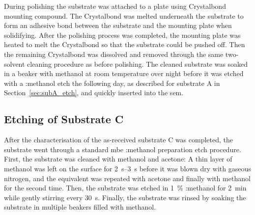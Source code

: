 During polishing the substrate was attached to a plate using Crystalbond mounting compound. The Crystalbond was melted underneath the substrate to form an adhesive bond between the substrate and the mounting plate when solidifying. After the polishing process was completed, the mounting plate was heated to melt the Crystalbond so that the substrate could be pushed off. Then the remaining Crystalbond was dissolved and removed through the same two-solvent cleaning procedure as before polishing. The cleaned substrate was soaked in a beaker with methanol at room temperature over night before it was etched with a :methanol etch the following day, as described for substrate A in Section~\ref{sec:subA_etch}, and quickly inserted into the \ac{sem}.

\subsection{Etching of Substrate C}

After the characterisation of the as-received substrate C was completed, the substrate went through a standard \ac{mbe} :methanol preparation etch procedure. First, the substrate was cleaned with methanol and acetone: A thin layer of methanol was left on the surface for \SIrange{2}{3}{\second} before it was blown dry with gaseous nitrogen, and the equivalent was repeated with acetone and finally with methanol for the second time. Then, the substrate was etched in \SI{1}{\percent} :methanol for \SI{2}{\minute} while gently stirring every \SI{30}{\second}. Finally, the substrate was rinsed by soaking the substrate in multiple beakers filled with methanol.



